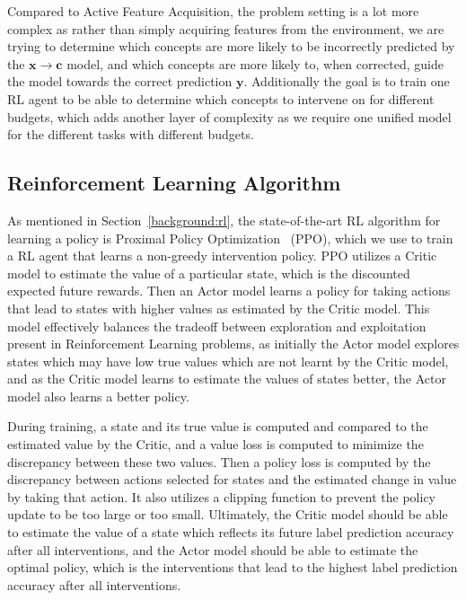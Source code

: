 Compared to Active Feature Acquisition, the problem setting is a lot more complex as
rather than simply acquiring features from the environment, we are trying to determine
which concepts are more likely to be incorrectly predicted by the $\mathbf{x} \to \mathbf{c}$ model, 
and
which concepts are more likely to, when corrected, guide the model towards the correct prediction
 $\mathbf{y}$.
Additionally the goal is to train one RL agent to be able to determine which concepts
to intervene on for different budgets, which adds another layer of complexity as we require
one unified model for the different tasks with different budgets.

\subsection{Reinforcement Learning Algorithm}

As mentioned in Section~\ref{background:rl}, the state-of-the-art RL algorithm 
for learning
a policy is Proximal Policy Optimization~\cite{ppo} (PPO), which we use
to train a RL agent that learns a non-greedy intervention policy.
PPO utilizes a Critic model to estimate
the value of a particular state, which is the discounted expected future rewards. Then
an Actor model learns a policy
for taking actions that lead to states with higher values as estimated by the
Critic model.
This model effectively balances the tradeoff between exploration and exploitation
present in Reinforcement Learning problems,
as initially the Actor model explores states which may have low true values
which are not learnt by the Critic model, and as the Critic model
learns to estimate the values of states better, the Actor model also 
learns a better policy.

During training, a state and its true value is computed
and compared to the estimated value by the Critic, and a value loss is computed to minimize
the discrepancy between these two values. Then a policy loss is computed
by the discrepancy between actions selected for states and the estimated
change in value by taking that action. It also utilizes
a clipping function to prevent the policy update 
to be too large or too small.
Ultimately, the Critic model
should be able to estimate the value of a state which reflects
its future label prediction accuracy after all interventions,
and the Actor model should be able to estimate the optimal policy, 
which is the interventions that lead to the highest label prediction accuracy 
after all interventions.

